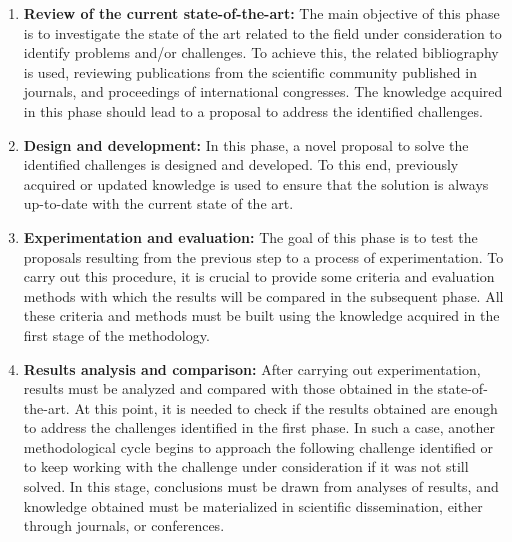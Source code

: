 \begin{enumerate}
    \item \textbf{Review of the current state-of-the-art:}  The main objective of this phase is to investigate the state of the art related to the field under consideration to identify problems and/or challenges. To achieve this, the related bibliography is used, reviewing publications from the scientific community published in journals, and proceedings of international congresses. The knowledge acquired in this phase should lead to a proposal to address the identified challenges.

 \item \textbf{Design and development:} In this phase, a novel proposal to solve the identified challenges is designed and developed. To this end, previously acquired or updated knowledge is used to ensure that the solution is always up-to-date with the current state of the art.

\item \textbf{Experimentation and evaluation:} The goal of this phase is to test the proposals resulting from the previous step to a process of experimentation. To carry out this procedure, it is crucial to provide some criteria and evaluation methods with which the results will be compared in the subsequent phase. All these criteria and methods must be built using the knowledge acquired in the first stage of the methodology.

\item \textbf{Results analysis and comparison:} After carrying out experimentation, results must be analyzed and compared with those obtained in the state-of-the-art. At this point, it is needed to check if the results obtained are enough to address the challenges identified in the first phase. In such a case, another methodological cycle begins to approach the following challenge identified or to keep working with the challenge under consideration if it was not still solved. In this stage, conclusions must be drawn from analyses of results, and knowledge obtained must be materialized in scientific dissemination, either
through journals, or conferences.

\end{enumerate}